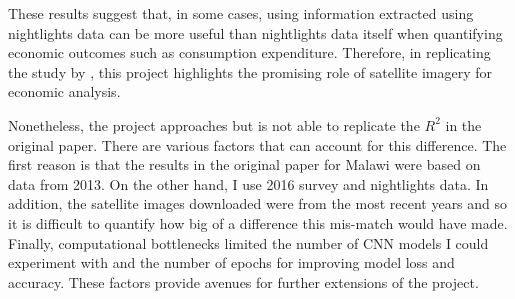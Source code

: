 \documentclass[11pt, a4paper, leqno]{article}
\begin{document}
\noindent These results suggest that, in some cases, using information extracted using nightlights data can be more useful than nightlights data itself when quantifying economic outcomes such as consumption expenditure. Therefore, in replicating the study by \citet{jean2016combining}, this project highlights the promising role of satellite imagery for economic analysis. 

\noindent Nonetheless, the project approaches but is not able to replicate the $R^2$ in the original paper. There are various factors that can account for this difference. The first reason is that the results in the original paper for Malawi were based on data from 2013. On the other hand, I use 2016 survey and nightlights data. In addition, the satellite images downloaded were from the most recent years and so it is difficult to quantify how big of a difference this mis-match would have made. Finally, computational bottlenecks limited the number of CNN models I could experiment with and the number of epochs for improving model loss and accuracy. These factors provide avenues for further extensions of the project. 

\printbibliography
{}



\end{document}
